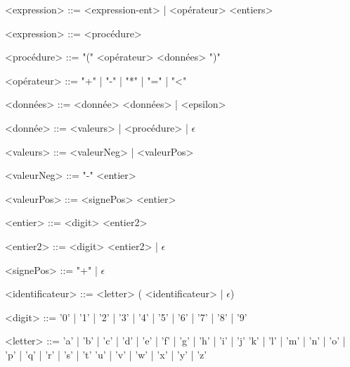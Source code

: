
	\begin{grammarC}{<expression> ::= <expression-ent> | <opérateur> <entiers>}
		
		<expression> ::= <procédure>
		
		<procédure> ::= "(" <opérateur> <données> ")"
				
		<opérateur> ::= "+" | "-" | "*" | "=" | "<" 
		
		<données> ::= <donnée> <données> | <epsilon>
		
		<donnée> ::= <valeurs> | <procédure> | $\epsilon$
		
		<valeurs> ::= <valeurNeg> | <valeurPos>
		
		<valeurNeg> ::= "-" <entier>
		
		<valeurPos> ::= <signePos> <entier>
		
		<entier> ::= <digit> <entier2>
		
 		<entier2> ::= <digit> <entier2> | $\epsilon$

		<signePos> ::= "+" | $\epsilon$ 
		
		<identificateur> ::= <letter> ( <identificateur> | $\epsilon$)
		
		<digit> ::= '0' | '1' | '2' | '3' | '4' | '5' | '6' | '7' | '8' | '9'
		
		<letter> ::= 'a' | 'b' | 'c' | 'd' | 'e' | 'f' | 'g' | 'h' | 'i' | 'j'
			    \alt 'k' | 'l' | 'm' | 'n' | 'o' | 'p' | 'q' | 'r' | 's' | 't'
				\alt 'u' | 'v' | 'w' | 'x' | 'y' | 'z'
		
		
	\end{grammarC}

